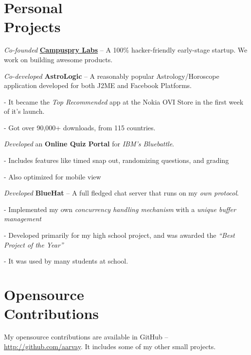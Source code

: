 \begin{resume}
		\section{\sc Personal \\Projects}	
			\begin{list2}
				\item \emph{Co-founded} \href{http://campuspry.com} {\textbf{\textsf{Campuspry Labs}}} -- A 100\% hacker-friendly early-stage startup. We work on building awesome products.
				\medskip
				\item \emph{Co-developed} \textbf{\textsf{AstroLogic}} -- A reasonably popular Astrology/Horoscope application developed for both J2ME and Facebook Platforms.
				\begin{list2}
					\item[-] It became the \emph{Top Recommended} app at the Nokia OVI Store in the first week of it's launch.
					\item[-] Got over 90,000+ downloads, from 115 countries.
				\end{list2}
				\medskip
				\item \emph{Developed} an \textbf{\textsf{Online Quiz Portal}} for \emph{IBM's Bluebattle}.
				\begin{list2}
					\item[-] Includes features like timed snap out, randomizing questions, and grading
					\item[-] Also optimized for mobile view
				\end{list2}
				\medskip
				\item \emph{Developed} \textbf{\textsf{BlueHat}} -- A full fledged chat server that runs on my \emph{own protocol}.
				\begin{list2}
					\item[-] Implemented my own \emph{concurrency handling mechanism} with a \emph{unique buffer management}
					\item[-] Developed primarily for my high school project, and was awarded the \emph{“Best Project of the Year”}
					\item[-] It was used by many students at school.
				\end{list2}
			\end{list2} 

		 \section{\sc Opensource \\Contributions}
		 	\begin{list1}
				\item[] My opensource contributions are available in GitHub -- \href{http://github.com/aarvay} {http://github.com/aarvay}. It includes some of my other small projects.
			\end{list1}
				

\end{resume}

